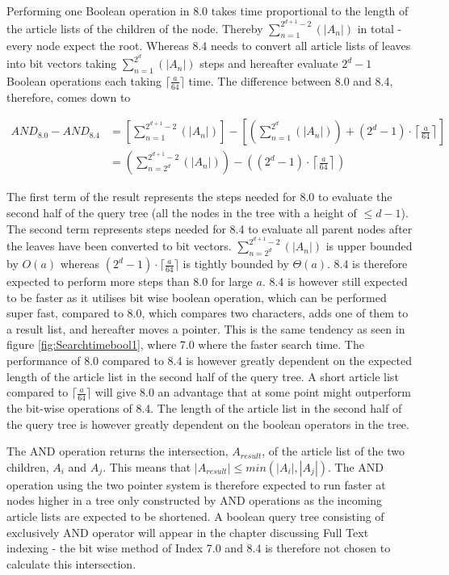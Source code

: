 Performing one Boolean operation in 8.0 takes time proportional to the length of the article lists of the children of the node. Thereby $\sum_{n=1}^{2^{d+1}-2}(|A_n|)$ in total - every node expect the root. Whereas 8.4 needs to convert all article lists of leaves into bit vectors taking $\sum_{n=1}^{2^{d}}(|A_n|)$ steps and hereafter evaluate $2^d-1$ Boolean operations each taking $\lceil \frac{a}{64} \rceil$ time. The difference between 8.0 and 8.4, therefore, comes down to 

\begin{equation} \label{eq1}
\begin{split}
 AND_{8.0} - AND_{8.4} & = \left[\sum_{n=1}^{2^{d+1}-2}(|A_n|)\right] - \left[\left(\sum_{n=1}^{2^{d}}(|A_n|)\right) + (2^{d}-1) \cdot \left\lceil \frac{a}{64} \right\rceil\right] \\
 & = \left(\sum_{n=2^d}^{2^{d+1}-2}(|A_n|)\right) - \left((2^{d}-1) \cdot \left\lceil \frac{a}{64} \right\rceil\right)
\end{split}
\end{equation}

The first term of the result represents the steps needed for 8.0 to evaluate the second half of the query tree (all the nodes in the tree with a height of $\leq d-1$). The second term represents steps needed for 8.4 to evaluate all parent nodes after the leaves have been converted to bit vectors.
$\sum_{n=2^d}^{2^{d+1}-2}(|A_n|)$ is upper bounded by $O(a)$ whereas $(2^{d}-1) \cdot \lceil \frac{a}{64} \rceil$ is tightly bounded by $\Theta(a)$. 8.4 is therefore expected to perform more steps than 8.0 for large $a$. 8.4 is however still expected to be faster as it utilises bit wise boolean operation, which can be performed super fast, compared to 8.0, which compares two characters, adds one of them to a result list, and hereafter moves a pointer. This is the same tendency as seen in figure \ref{fig:Searchtimebool1}, where 7.0 where the faster search time. The performance of 8.0 compared to 8.4 is however greatly dependent on the expected length of the article list in the second half of the query tree. A short article list compared to $\lceil \frac{a}{64} \rceil$ will give 8.0 an advantage that at some point might outperform the bit-wise operations of 8.4. The length of the article list in the second half of the query tree is however greatly dependent on the boolean operators in the tree. 

The AND operation returns the intersection, $A_{result}$, of the article list of the two children, $A_i$ and $A_j$. This means that $|A_{result}|\leq min(|A_i|,|A_j|)$. The AND operation using the two pointer system is therefore expected to run faster at nodes higher in a tree only constructed by AND operations as the incoming article lists are expected to be shortened. A boolean query tree consisting of exclusively AND operator will appear in the chapter discussing Full Text indexing - the bit wise method of Index 7.0 and 8.4 is therefore not chosen to calculate this intersection.

